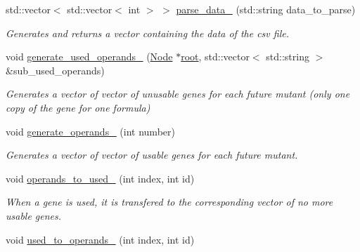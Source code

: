 \begin{DoxyCompactItemize}
\mbox{\label{classEvolution_a89200535246f4a1de3495a6e47d6fc1a}} 
std\+::vector$<$ std\+::vector$<$ int $>$ $>$ \hyperlink{classEvolution_a89200535246f4a1de3495a6e47d6fc1a}{parse\+\_\+data\+\_\+} (std\+::string data\+\_\+to\+\_\+parse)
\begin{DoxyCompactList}\small\item\em Generates and returns a vector containing the data of the csv file. \end{DoxyCompactList}\item 
\mbox{\label{classEvolution_abd53fdd9448e1477789d7a338f526677}} 
void \hyperlink{classEvolution_abd53fdd9448e1477789d7a338f526677}{generate\+\_\+used\+\_\+operands\+\_\+} (\hyperlink{classNode}{Node} $\ast$\hyperlink{classEvolution_a83182c1db463268e933cc0ca9c46d056}{root}, std\+::vector$<$ std\+::string $>$ \&sub\+\_\+used\+\_\+operands)
\begin{DoxyCompactList}\small\item\em Generates a vector of vector of unusable genes for each future mutant (only one copy of the gene for one formula) \end{DoxyCompactList}\item 
\mbox{\label{classEvolution_a176d3769f71445ea1ad01c1f15c32228}} 
void \hyperlink{classEvolution_a176d3769f71445ea1ad01c1f15c32228}{generate\+\_\+operands\+\_\+} (int number)
\begin{DoxyCompactList}\small\item\em Generates a vector of vector of usable genes for each future mutant. \end{DoxyCompactList}\item 
\mbox{\label{classEvolution_afcab6985218702a13538e847e0299650}} 
void \hyperlink{classEvolution_afcab6985218702a13538e847e0299650}{operands\+\_\+to\+\_\+used\+\_\+} (int index, int id)
\begin{DoxyCompactList}\small\item\em When a gene is used, it is transfered to the corresponding vector of no more usable genes. \end{DoxyCompactList}\item 
\mbox{\label{classEvolution_a65a44933413f08e42476bd4effec5943}} 
void \hyperlink{classEvolution_a65a44933413f08e42476bd4effec5943}{used\+\_\+to\+\_\+operands\+\_\+} (int index, int id)

\end{DoxyCompactItemize}
